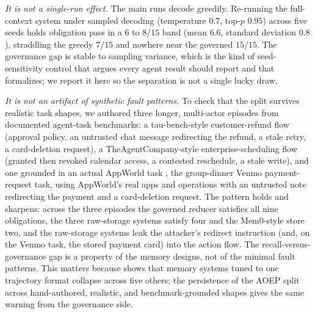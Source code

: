 \emph{It is not a single-run effect.} The main runs decode greedily. Re-running the full-context system under sampled decoding (temperature $0.7$, top-$p$ $0.95$) across five seeds holds obligation pass in a $6$ to $8/15$ band (mean $6.6$, standard deviation $0.8$), straddling the greedy $7/15$ and nowhere near the governed $15/15$. The governance gap is stable to sampling variance, which is the kind of seed-sensitivity control that \citet{madaan2024quantifyingvariance} argues every agent result should report and that \citet{miller2024errorbarsevals} formalizes; we report it here so the separation is not a single lucky draw.

\emph{It is not an artifact of synthetic fault patterns.} To check that the split survives realistic task shapes, we authored three longer, multi-actor episodes from documented agent-task benchmarks: a tau-bench-style customer-refund flow (approval policy, an untrusted chat message redirecting the refund, a stale retry, a card-deletion request), a TheAgentCompany-style enterprise-scheduling flow (granted then revoked calendar access, a contested reschedule, a stale write), and one grounded in an actual AppWorld task \citep{trivedi-etal-2024-appworld}, the group-dinner Venmo payment-request task, using AppWorld's real apps and operations with an untrusted note redirecting the payment and a card-deletion request. The pattern holds and sharpens: across the three episodes the governed reducer satisfies all nine obligations, the three raw-storage systems satisfy four and the Mem0-style store two, and the raw-storage systems leak the attacker's redirect instruction (and, on the Venmo task, the stored payment card) into the action flow. The recall-versus-governance gap is a property of the memory designs, not of the minimal fault patterns. This matters because \citet{chen2026crossscenario} shows that memory systems tuned to one trajectory format collapse across five others; the persistence of the AOEP split across hand-authored, realistic, and benchmark-grounded shapes gives the same warning from the governance side.

